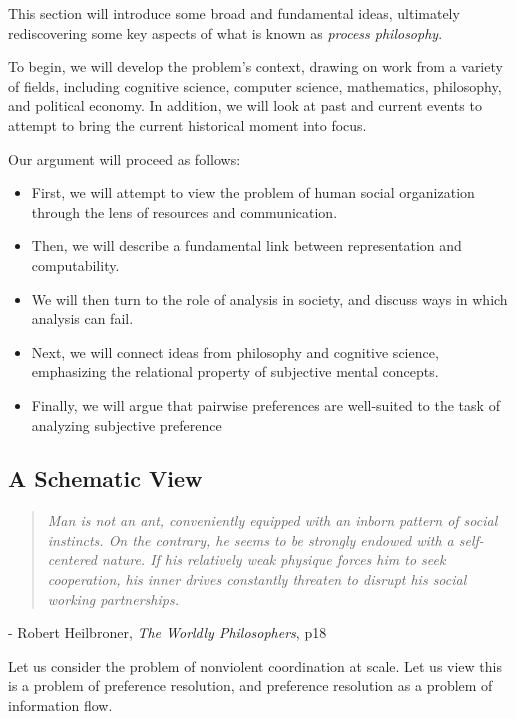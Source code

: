
This section will introduce some broad and fundamental ideas, ultimately rediscovering some key aspects of what is known as \textit{process philosophy}.

To begin, we will develop the problem's context, drawing on work from a variety of fields, including cognitive science, computer science, mathematics, philosophy, and political economy.
In addition, we will look at past and current events to attempt to bring the current historical moment into focus.

\bigskip

Our argument will proceed as follows:

\begin{itemize}
	\item First, we will attempt to view the problem of human social organization through the lens of resources and communication.
	\item Then, we will describe a fundamental link between representation and computability.
	\item We will then turn to the role of analysis in society, and discuss ways in which analysis can fail.
	\item Next, we will connect ideas from philosophy and cognitive science, emphasizing the relational property of subjective mental concepts.
	\item Finally, we will argue that pairwise preferences are well-suited to the task of analyzing subjective preference
\end{itemize}

\subsection{A Schematic View}

\begin{center}
\begin{quotation}
\textit{Man is not an ant, conveniently equipped with an inborn pattern of social instincts.
	On the contrary, he seems to be strongly endowed with a self-centered nature.
	If his relatively weak physique forces him to seek cooperation, his inner drives constantly threaten to disrupt his social working partnerships.}
\end{quotation}
	- Robert Heilbroner, \textit{The Worldly Philosophers}, p18
\end{center}

Let us consider the problem of nonviolent coordination at scale.
Let us view this is a problem of preference resolution, and preference resolution as a problem of information flow.

